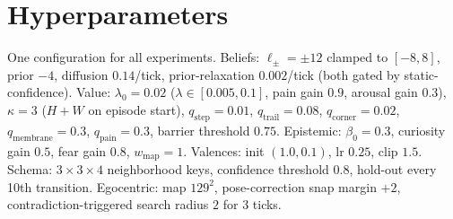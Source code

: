 \documentclass[11pt]{article}
\begin{document}
\section{Hyperparameters}
\label{sec:hypers}
One configuration for all experiments. Beliefs: $\ell_\pm{=}{\pm}12$ clamped to $[-8,8]$, prior $-4$, diffusion $0.14$/tick, prior-relaxation $0.002$/tick (both gated by static-confidence). Value: $\lambda_0{=}0.02$ ($\lambda\in[0.005,0.1]$, pain gain $0.9$, arousal gain $0.3$), $\kappa{=}3$ ($H{+}W$ on episode start), $q_{\text{step}}{=}0.01$, $q_{\text{trail}}{=}0.08$, $q_{\text{corner}}{=}0.02$, $q_{\text{membrane}}{=}0.3$, $q_{\text{pain}}{=}0.3$, barrier threshold $0.75$. Epistemic: $\beta_0{=}0.3$, curiosity gain $0.5$, fear gain $0.8$, $w_{\text{map}}{=}1$. Valences: init $(1.0, 0.1)$, lr $0.25$, clip $1.5$. Schema: $3{\times}3{\times}4$ neighborhood keys, confidence threshold $0.8$, hold-out every 10th transition. Egocentric: map $129^2$, pose-correction snap margin $+2$, contradiction-triggered search radius $2$ for 3 ticks.
\end{document}
